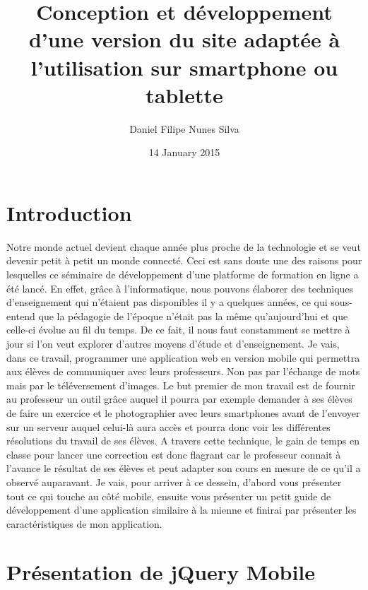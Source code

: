 \documentclass[letterpaper,10pt,french]{sphinxmanual}
\title{Conception et développement   d’une version du site adaptée à l’utilisation sur smartphone ou tablette}
\date{14 January 2015}
\author{Daniel Filipe Nunes Silva}
\begin{document}
\maketitle
\tableofcontents
{}\label{index::doc}



\chapter{Introduction}
\label{intro::doc}\label{intro:bienvenue-sur-le-travail-ecrit}\label{intro:introduction}
Notre monde actuel devient chaque année plus proche de la technologie et se veut
devenir petit à petit un monde connecté. Ceci est sans doute une des raisons
pour lesquelles ce séminaire de développement d'une platforme de formation
en ligne a été lancé. En effet, grâce à l'informatique, nous pouvons élaborer
des techniques d'enseignement qui n'étaient pas disponibles il y a quelques
années, ce qui sous-entend que la pédagogie de l'époque n'était pas la même qu'aujourd'hui et que
celle-ci évolue au fil du temps. De ce fait, il nous faut constamment se mettre à jour si l'on
veut explorer d'autres moyens d'étude et d'enseignement. Je vais, dans ce travail,
programmer une application web en version mobile qui permettra aux élèves de
communiquer avec leurs professeurs. Non pas par l'échange de mots mais par le
téléversement d'images. Le but premier de mon travail est de fournir au professeur
un outil grâce auquel il pourra par exemple demander à ses élèves de faire un
exercice et le photographier avec leurs smartphones avant de l'envoyer sur un serveur auquel celui-là
aura accès et pourra donc voir les différentes résolutions du travail de ses élèves.
A travers cette technique, le gain de temps en classe pour lancer une correction
est donc flagrant car le professeur connait à l'avance le résultat de ses élèves
et peut adapter son cours en mesure de ce qu'il a observé auparavant. Je vais, pour arriver à
ce dessein, d'abord vous présenter tout ce qui touche au côté mobile, ensuite
vous présenter un petit guide de développement d'une application similaire à la
mienne et finirai par présenter les caractéristiques de mon application.


\chapter{Présentation de jQuery Mobile}
\label{presentation_jQM::doc}\label{presentation_jQM:presentation-de-jquery-mobile}
\end{document}
